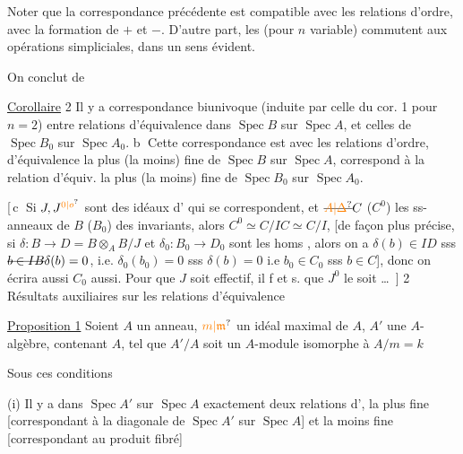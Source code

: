 Noter que la correspondance précédente est compatible avec les relations d'ordre,   avec la formation de $+$ et $-$. D'autre part, les   (pour $n$ variable) commutent aux opérations simpliciales, dans un sens évident. 

On conclut de  

\uline{Corollaire} 2 \quad {} Il y a correspondance biunivoque (induite par celle du cor. 1 pour $n=2$) entre relations d'équivalence dans
$\operatorname{Spec} B$ sur $\operatorname{Spec} A$, et celles de $\operatorname{Spec} B_0$ sur $\operatorname{Spec} A_0$. \textcircled{b} Cette correspondance est  avec les relations d'ordre,   d'équivalence la plus (la moins) fine de  $\operatorname{Spec} B$ sur $\operatorname{Spec} A$, correspond à la relation d'équiv. la plus (la moins) fine de $\operatorname{Spec} B_0$ sur $\operatorname{Spec} A_0$.

[\,\textcircled{c} Si $J,J^{\unsure{0|o}}$ sont des idéaux d' qui se correspondent, et $\deleted{\unsure{A|\Delta}} C$ ($C^0$) les ss-anneaux de $B$ ($B_0$) des invariants, alors $C^0\simeq C/IC\simeq C/I$, [de façon plus précise, si $\delta:B\longrightarrow D=B\otimes_A B/J$ et $\delta_0:B_0\longrightarrow D_0$ sont les homs , alors on a
$\delta(b)\in ID$ sss $\deleted{b\in IB}\delta(b)=0$, i.e. $\delta_0(b_0)=0$ sss $\delta(b)=0$ i.e $b_0\in C_0$ sss $b\in C$], donc on écrira aussi $C_0$ aussi. Pour que $J$ soit effectif, il f et s. que $J^0$ le soit \ldots\ ]
\textcircled{2} Résultats auxiliaires sur les relations d'équivalence

\uline{Proposition 1} \quad Soient $A$ un anneau, $\unsure{m|\mathfrak m}$ un idéal maximal de $A$, $A'$ une $A$-algèbre, contenant $A$, tel que $A'/A$ soit un $A$-module isomorphe à $A/m=k$

Sous ces conditions

(i) Il y a dans $\operatorname{Spec}A'$ sur $\operatorname{Spec}A$ exactement deux relations d', la plus fine  [correspondant à la diagonale de $\operatorname{Spec}A'$ sur $\operatorname{Spec} A$] et la moins fine [correspondant au produit fibré]

